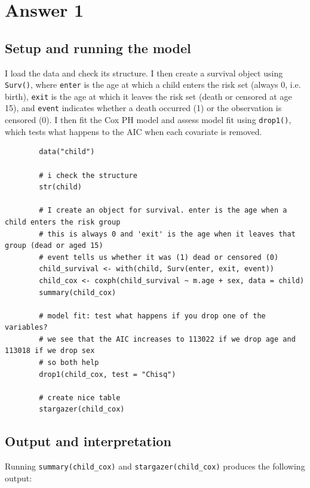 \documentclass[12pt,letterpaper]{article}
\begin{document}
	\section{Answer 1}
	
	\subsection{Setup and running the model}
	
	\noindent I load the data and check its structure. I then create a survival object using \texttt{Surv()}, where \texttt{enter} is the age at which a child enters the risk set (always 0, i.e. birth), \texttt{exit} is the age at which it leaves the risk set (death or censored at age 15), and \texttt{event} indicates whether a death occurred (1) or the observation is censored (0). I then fit the Cox PH model and assess model fit using \texttt{drop1()}, which tests what happens to the AIC when each covariate is removed.\newline
	
	\tiny \begin{BVerbatim}
		data("child")
		
		# i check the structure
		str(child)
		
		# I create an object for survival. enter is the age when a child enters the risk group
		# this is always 0 and 'exit' is the age when it leaves that group (dead or aged 15)
		# event tells us whether it was (1) dead or censored (0)
		child_survival <- with(child, Surv(enter, exit, event))
		child_cox <- coxph(child_survival ~ m.age + sex, data = child)
		summary(child_cox)
		
		# model fit: test what happens if you drop one of the variables?
		# we see that the AIC increases to 113022 if we drop age and 113018 if we drop sex
		# so both help
		drop1(child_cox, test = "Chisq")
		
		# create nice table
		stargazer(child_cox)
	\end{BVerbatim}
	\normalsize \newline
	
	\subsection{Output and interpretation}
	
	\noindent Running \texttt{summary(child\_cox)} and \texttt{stargazer(child\_cox)} produces the following output:\newline
	
\end{document}
